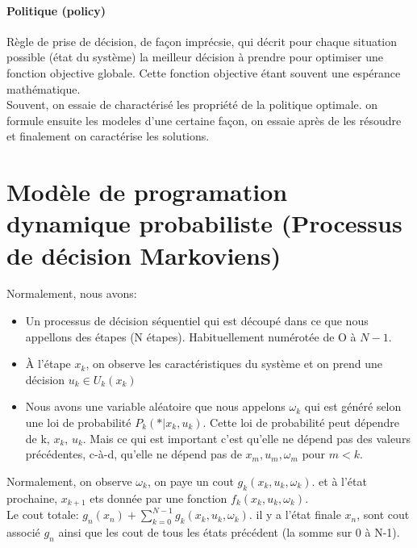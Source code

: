 \documentclass[oneside]{book}
\begin{document}
\paragraph{Politique (policy)} Règle de prise de décision, de façon imprécsie, qui décrit pour chaque situation possible (état du système) la meilleur décision à prendre pour optimiser une fonction objective globale. Cette fonction objective étant souvent une espérance mathématique.\\

Souvent, on essaie de charactérisé les propriété de la politique optimale. on formule ensuite les modeles d'une certaine façon, on essaie après de les résoudre et finalement on caractérise les solutions.\\

\section{Modèle de programation dynamique probabiliste (Processus de décision Markoviens)} 
Normalement, nous avons:

\begin{itemize}
\item Un processus de décision séquentiel qui est découpé dans ce que nous appellons des étapes (N étapes). Habituellement numérotée de O à $N-1$. 

\item À l'étape $x_k$, on observe les caractéristiques du système et on prend une décision $u_k \in U_k(x_k)$

\item Nous avons une variable aléatoire que nous appelons $\omega_k$ qui est généré selon une loi de probabilité $P_k(*|x_k,u_k)$. Cette loi de probabilité peut dépendre de k, $x_k$, $u_k$. Mais ce qui est important c'est qu'elle ne dépend pas des valeurs précédentes, c-à-d, qu'elle ne dépend pas de $x_m,u_m,\omega_m$ pour $m < k$.
\end{itemize}

Normalement, on observe $\omega_k$, on paye un cout $g_k(x_k,u_k,\omega_k)$. et à l'état prochaine, $x_{k+1}$ ets donnée par une fonction $f_k(x_k,u_k,\omega_k)$.\\

Le cout totale: $g_n(x_n) + \sum\limits_{k=0}^{N-1}g_k(x_k,u_k,\omega_k)$. il y a l'état finale $x_n$, sont cout associé $g_n$ ainsi que les cout de tous les états précédent (la somme sur 0 à N-1). \\
\end{document}
